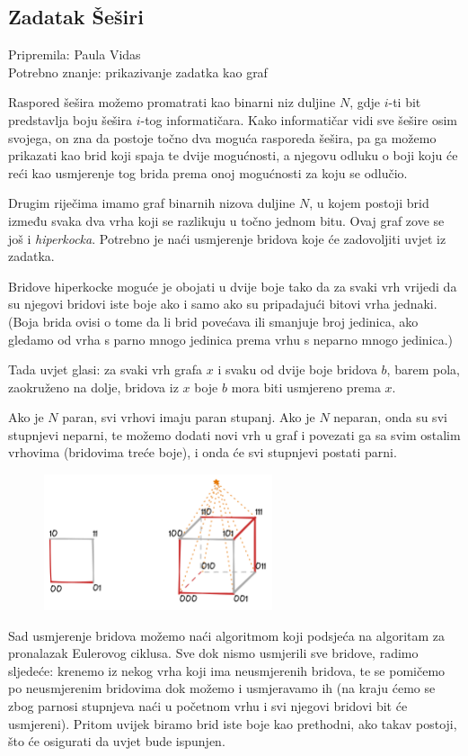 \subsection*{Zadatak Šeširi}
\textsf{Pripremila: Paula Vidas}\\
\textsf{Potrebno znanje: prikazivanje zadatka kao graf}

Raspored šešira možemo promatrati kao binarni niz duljine $N$, gdje $i$-ti bit
predstavlja boju šešira $i$-tog informatičara.
Kako informatičar vidi sve šešire osim svojega, on zna da postoje točno dva moguća
rasporeda šešira, pa ga možemo prikazati kao brid koji spaja te dvije mogućnosti,
a njegovu odluku o boji koju će reći kao usmjerenje tog brida prema onoj mogućnosti
za koju se odlučio.

Drugim riječima imamo graf binarnih nizova duljine $N$, u kojem postoji brid
između svaka dva vrha koji se razlikuju u točno jednom bitu. Ovaj graf zove se još
i \textit{hiperkocka}. Potrebno je naći usmjerenje bridova koje će zadovoljiti
uvjet iz zadatka.

Bridove hiperkocke moguće je obojati u dvije boje tako da za svaki vrh vrijedi da su njegovi
bridovi iste boje ako i samo ako su pripadajući bitovi vrha jednaki. (Boja brida ovisi o tome
da li brid povećava ili smanjuje broj jedinica, ako gledamo od vrha s parno mnogo jedinica
prema vrhu s neparno mnogo jedinica.)

Tada uvjet glasi: za svaki vrh grafa $x$ i svaku od dvije boje bridova $b$, barem pola,
zaokruženo na dolje, bridova iz $x$ boje $b$ mora biti usmjereno prema $x$.

Ako je $N$ paran, svi vrhovi imaju paran stupanj. Ako je $N$ neparan, onda
su svi stupnjevi neparni, te možemo dodati novi vrh u graf i povezati ga sa svim ostalim
vrhovima (bridovima treće boje), i onda će svi stupnjevi postati parni.

\begin{figure}[H]
    \centering
    \includegraphics[width=0.6\textwidth]{img/sesiri_editorial.excalidraw.png}
\end{figure}

Sad usmjerenje bridova možemo naći algoritmom koji podsjeća na algoritam za pronalazak
Eulerovog ciklusa. Sve dok nismo usmjerili sve bridove, radimo sljedeće: krenemo iz nekog
vrha koji ima neusmjerenih bridova, te se pomičemo po neusmjerenim bridovima dok možemo i usmjeravamo ih
(na kraju ćemo se zbog parnosi stupnjeva naći u početnom vrhu i svi njegovi bridovi bit će usmjereni).
Pritom uvijek biramo brid iste boje kao prethodni, ako takav postoji, što će osigurati da uvjet bude ispunjen.

